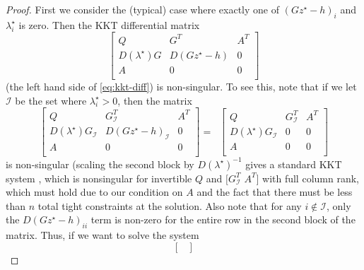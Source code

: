 \begin{proof}
    First we consider the (typical) case where exactly one of $(Gz^\star - h)_i$
    and $\lambda^\star_i$ is zero.  Then the KKT differential matrix
    \begin{equation}
        \begin{bmatrix}
            Q                 & G^T           & A^T \\
            D(\lambda^\star)G & D(Gz^\star-h) & 0   \\
            A                 & 0             & 0   \\
        \end{bmatrix}
    \end{equation}
    (the left hand side of \eqref{eq:kkt-diff}) is non-singular.  To see this,
    note that if we let $\mathcal{I}$ be the set where $\lambda^\star_i  > 0$,
    then the matrix
    \begin{equation}
        \begin{bmatrix}
            Q                               & G_{\mathcal{I}}^T           & A^T \\
            D(\lambda^\star)G_{\mathcal{I}} & D(Gz^\star-h)_{\mathcal{I}} & 0   \\
            A                               & 0                           & 0   \\
        \end{bmatrix}
        = \;\; \begin{bmatrix}
            Q                               & G_{\mathcal{I}}^T & A^T \\
            D(\lambda^\star)G_{\mathcal{I}} & 0                 & 0   \\
            A                               & 0                 & 0   \\
        \end{bmatrix}
    \end{equation}
    is non-singular (scaling the second block by $D(\lambda^\star)^{-1}$ gives a
    standard KKT system \citep[Section 10.4]{boyd2004convex}, which is nonsingular
    for invertible $Q$ and $[G_\mathcal{I}^T$ \; $A^T]$ with full column rank,
    which must hold due to our condition on $A$ and the fact that there must be
    less than $n$ total tight constraints at the solution.  Also note that for any
    $i \not \in \mathcal{I}$, only the
    $D(Gz^\star -h)_{ii}$ term is non-zero for the entire row in the second block
    of the matrix.  Thus, if we want to solve the system
    \begin{equation}
        \begin{bmatrix}

\end{bmatrix}
\end{equation}
\end{proof}
